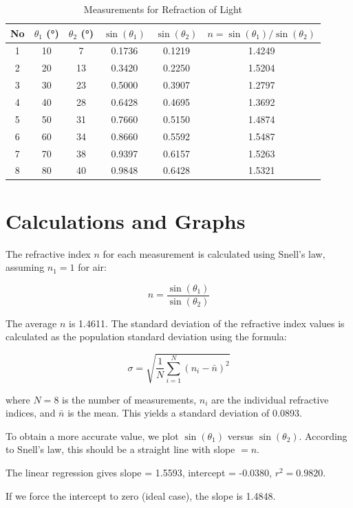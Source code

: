 \documentclass[12pt, a4paper]{article}
\begin{document}
\begin{small}
	\begin{longtable}{|c|c|c|c|c|c|}
		\caption{Measurements for Refraction of Light} \label{tab:measurements} \\
		\hline
        \textbf{No} & \textbf{$\theta_1$ (°)} & \textbf{$\theta_2$ (°)} & \textbf{$\sin(\theta_1)$} & \textbf{$\sin(\theta_2)$} & \textbf{$n = \sin(\theta_1)/\sin(\theta_2)$} \\
		\hline
		1 & 10 & 7 & 0.1736 & 0.1219 & 1.4249 \\
		2 & 20 & 13 & 0.3420 & 0.2250 & 1.5204 \\
		3 & 30 & 23 & 0.5000 & 0.3907 & 1.2797 \\
		4 & 40 & 28 & 0.6428 & 0.4695 & 1.3692 \\
		5 & 50 & 31 & 0.7660 & 0.5150 & 1.4874 \\
		6 & 60 & 34 & 0.8660 & 0.5592 & 1.5487 \\
		7 & 70 & 38 & 0.9397 & 0.6157 & 1.5263 \\
		8 & 80 & 40 & 0.9848 & 0.6428 & 1.5321 \\
		\hline
	\end{longtable}
\end{small}

\section{Calculations and Graphs}
The refractive index $n$ for each measurement is calculated using Snell's law, assuming $n_1 = 1$ for air:

\[ n = \frac{\sin(\theta_1)}{\sin(\theta_2)} \]

The average $n$ is 1.4611. The standard deviation of the refractive index values is calculated as the population standard deviation using the formula:

\[ \sigma = \sqrt{\frac{1}{N} \sum_{i=1}^{N} (n_i - \bar{n})^2} \]

where $N=8$ is the number of measurements, $n_i$ are the individual refractive indices, and $\bar{n}$ is the mean. This yields a standard deviation of 0.0893.

To obtain a more accurate value, we plot $\sin(\theta_1)$ versus $\sin(\theta_2)$. According to Snell's law, this should be a straight line with slope $= n$.

The linear regression gives slope = 1.5593, intercept = -0.0380, $r^2 = 0.9820$.

If we force the intercept to zero (ideal case), the slope is 1.4848.
\end{document}
